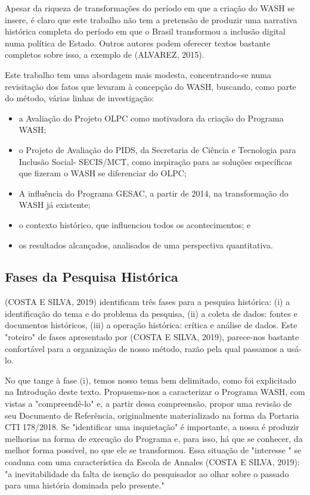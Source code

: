 Apesar da riqueza de transformações do período em que a criação do WASH se insere, é claro que este trabalho não tem a pretensão de produzir uma narrativa histórica completa do período em que o Brasil transformou a inclusão digital numa política de Estado. Outros autores podem oferecer textos bastante completos sobre isso, a exemplo de  (ALVAREZ, 2015).

Este trabalho tem uma abordagem mais modesta, concentrando-se numa revisitação dos fatos que levaram à concepção do WASH, buscando, como parte do método, várias linhas de investigação:


\begin{itemize}
\item a Avaliação do Projeto OLPC como motivadora da criação do Programa WASH;
\item o Projeto de Avaliação do PIDS, da Secretaria de Ciência e Tecnologia para Inclusão Social- SECIS/MCT, como inspiração para as soluções específicas que fizeram o WASH se diferenciar do OLPC;
\item A influência do Programa GESAC, a partir de 2014, na transformação do WASH já existente;
\item o contexto histórico, que influenciou todos os acontecimentos; e
\item os resultados alcançados, analisados de uma perspectiva quantitativa.
\end{itemize}

\subsection[Fases da Pesquisa Histórica]{Fases da Pesquisa Histórica}\label{Fases da Pesquisa Histórica}
(COSTA E SILVA, 2019) identificam três fases para a pesquisa histórica: (i) a identificação do tema e do problema da pesquisa, (ii) a coleta de dados: fontes e documentos históricos, (iii) a operação histórica: crítica e análise de dados. Este "roteiro" de fases apresentado por (COSTA E SILVA, 2019), parece-nos bastante confortável para a organização de nosso método, razão pela qual passamos a usá-lo.

No que tange à fase (i), temos nosso tema bem delimitado, como foi explicitado na Introdução deste texto. Propusemo-nos a caracterizar o Programa WASH, com vistas a "compreendê-lo" e, a partir dessa compreensão, propor uma revisão de seu Documento de Referência, originalmente materializado na forma da Portaria CTI 178/2018. Se "identificar uma inquietação" é importante, a nossa é produzir melhorias na forma de execução do Programa e, para isso, há que se conhecer, da melhor forma possível, no que ele se transformou. Essa situação de "interesse " se coaduna com uma característica da Escola de Annales  (COSTA E SILVA, 2019): "a inevitabilidade da falta de isenção do pesquisador ao olhar sobre o passado para uma história dominada pelo presente."

